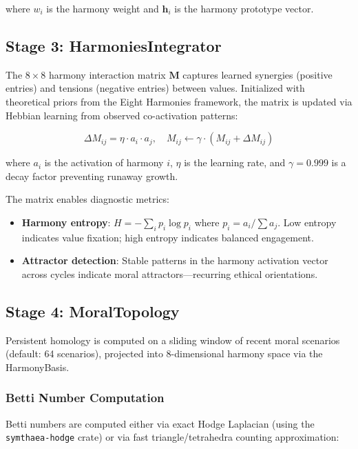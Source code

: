 \documentclass[11pt,a4paper]{article}
\begin{document}
\noindent where $w_i$ is the harmony weight and $\mathbf{h}_i$ is the harmony prototype vector.

\subsection{Stage 3: HarmoniesIntegrator}

The $8 \times 8$ harmony interaction matrix $\mathbf{M}$ captures learned synergies (positive entries) and tensions (negative entries) between values. Initialized with theoretical priors from the Eight Harmonies framework, the matrix is updated via Hebbian learning from observed co-activation patterns:

\begin{equation}
\Delta M_{ij} = \eta \cdot a_i \cdot a_j, \quad M_{ij} \leftarrow \gamma \cdot (M_{ij} + \Delta M_{ij})
\end{equation}

\noindent where $a_i$ is the activation of harmony $i$, $\eta$ is the learning rate, and $\gamma = 0.999$ is a decay factor preventing runaway growth.

The matrix enables diagnostic metrics:
\begin{itemize}
  \item \textbf{Harmony entropy}: $H = -\sum_i p_i \log p_i$ where $p_i = a_i / \sum a_j$. Low entropy indicates value fixation; high entropy indicates balanced engagement.
  \item \textbf{Attractor detection}: Stable patterns in the harmony activation vector across cycles indicate moral attractors---recurring ethical orientations.
\end{itemize}

\subsection{Stage 4: MoralTopology}

Persistent homology is computed on a sliding window of recent moral scenarios (default: 64 scenarios), projected into 8-dimensional harmony space via the HarmonyBasis.

\subsubsection{Betti Number Computation}

Betti numbers are computed either via exact Hodge Laplacian (using the \texttt{symthaea-hodge} crate) or via fast triangle/tetrahedra counting approximation:
\end{document}
